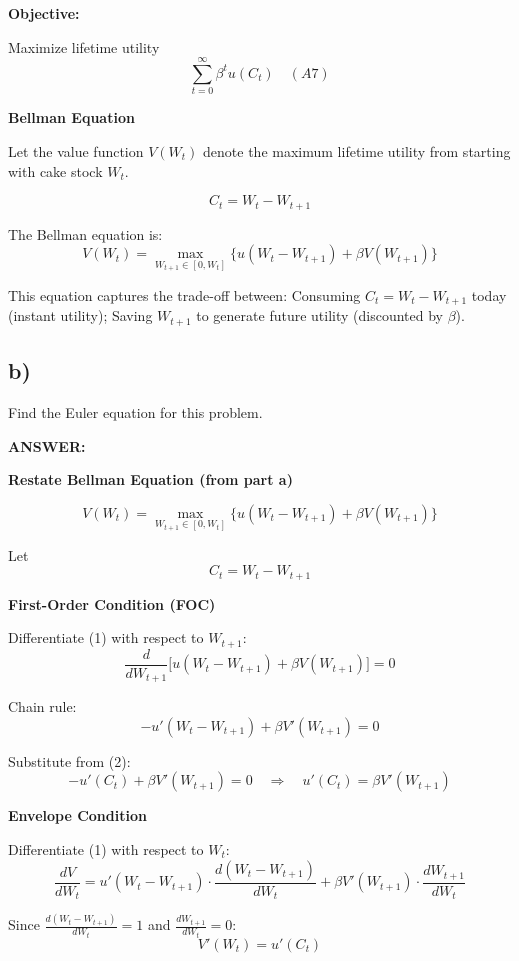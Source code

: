 \documentclass[12pt]{article}
\begin{document}
\textbf{Objective:}

Maximize lifetime utility
\[
\sum_{t=0}^{\infty} \beta^t u(C_t) \quad (A7)
\]

\textbf{Bellman Equation}

Let the value function \( V(W_t) \) denote the maximum lifetime utility from starting with cake stock \( W_t \).

\[
C_t = W_t - W_{t+1} \tag{1}
\]

The Bellman equation is:
\[
V(W_t) = \max_{W_{t+1} \in [0, W_t]} \Big\{ u(W_t - W_{t+1}) + \beta V(W_{t+1}) \Big\} \tag{2}
\]

This equation captures the trade-off between: Consuming \( C_t = W_t - W_{t+1} \) today (instant utility); Saving \( W_{t+1} \) to generate future utility (discounted by \( \beta \)).

\subsection*{\textbf{b)}}

Find the Euler equation for this problem.

\vspace{0.5em}
\noindent\textcolor{formalred}{\textbf{ANSWER:}}


\textbf{Restate Bellman Equation (from part a)}

\[
V(W_t) = \max_{W_{t+1} \in [0, W_t]} \Big\{ u(W_t - W_{t+1}) + \beta V(W_{t+1}) \Big\} \tag{1}
\]

Let
\[
C_t = W_t - W_{t+1} \tag{2}
\]

\textbf{First-Order Condition (FOC)}

Differentiate (1) with respect to \( W_{t+1} \):
\[
\frac{d}{dW_{t+1}} \Big[ u(W_t - W_{t+1}) + \beta V(W_{t+1}) \Big] = 0 \tag{3}
\]

Chain rule:
\[
- u'(W_t - W_{t+1}) + \beta V'(W_{t+1}) = 0 \tag{4}
\]

Substitute from (2):
\[
- u'(C_t) + \beta V'(W_{t+1}) = 0 
\quad \Rightarrow \quad
u'(C_t) = \beta V'(W_{t+1}) \tag{5}
\]

\textbf{Envelope Condition}

Differentiate (1) with respect to \( W_t \):
\[
\frac{dV}{dW_t} 
= u'(W_t - W_{t+1}) \cdot \frac{d(W_t - W_{t+1})}{dW_t} + \beta V'(W_{t+1}) \cdot \frac{dW_{t+1}}{dW_t} \tag{6}
\]

Since 
\(\frac{d(W_t - W_{t+1})}{dW_t} = 1\) 
and 
\(\frac{dW_{t+1}}{dW_t} = 0\):
\[
V'(W_t) = u'(C_t) \tag{7}
\]
\end{document}
